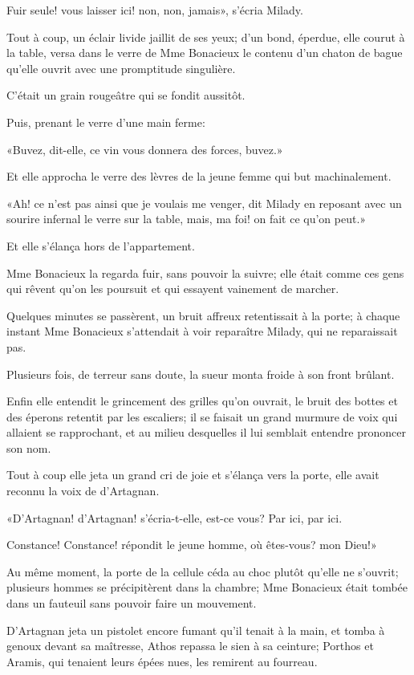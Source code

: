 \speak  Fuir seule! vous laisser ici! non, non, jamais», s'écria Milady. 

Tout à coup, un éclair livide jaillit de ses yeux; d'un bond, éperdue, elle courut à la table, versa dans le verre de Mme Bonacieux le contenu d'un chaton de bague qu'elle ouvrit avec une promptitude singulière. 

C'était un grain rougeâtre qui se fondit aussitôt. 

Puis, prenant le verre d'une main ferme: 

«Buvez, dit-elle, ce vin vous donnera des forces, buvez.» 

Et elle approcha le verre des lèvres de la jeune femme qui but machinalement. 

«Ah! ce n'est pas ainsi que je voulais me venger, dit Milady en reposant avec un sourire infernal le verre sur la table, mais, ma foi! on fait ce qu'on peut.» 

Et elle s'élança hors de l'appartement. 

Mme Bonacieux la regarda fuir, sans pouvoir la suivre; elle était comme ces gens qui rêvent qu'on les poursuit et qui essayent vainement de marcher. 

Quelques minutes se passèrent, un bruit affreux retentissait à la porte; à chaque instant Mme Bonacieux s'attendait à voir reparaître Milady, qui ne reparaissait pas. 

Plusieurs fois, de terreur sans doute, la sueur monta froide à son front brûlant. 

Enfin elle entendit le grincement des grilles qu'on ouvrait, le bruit des bottes et des éperons retentit par les escaliers; il se faisait un grand murmure de voix qui allaient se rapprochant, et au milieu desquelles il lui semblait entendre prononcer son nom. 

Tout à coup elle jeta un grand cri de joie et s'élança vers la porte, elle avait reconnu la voix de d'Artagnan. 

«D'Artagnan! d'Artagnan! s'écria-t-elle, est-ce vous? Par ici, par ici. 

\speak  Constance! Constance! répondit le jeune homme, où êtes-vous? mon Dieu!» 

Au même moment, la porte de la cellule céda au choc plutôt qu'elle ne s'ouvrit; plusieurs hommes se précipitèrent dans la chambre; Mme Bonacieux était tombée dans un fauteuil sans pouvoir faire un mouvement. 

D'Artagnan jeta un pistolet encore fumant qu'il tenait à la main, et tomba à genoux devant sa maîtresse, Athos repassa le sien à sa ceinture; Porthos et Aramis, qui tenaient leurs épées nues, les remirent au fourreau. 

